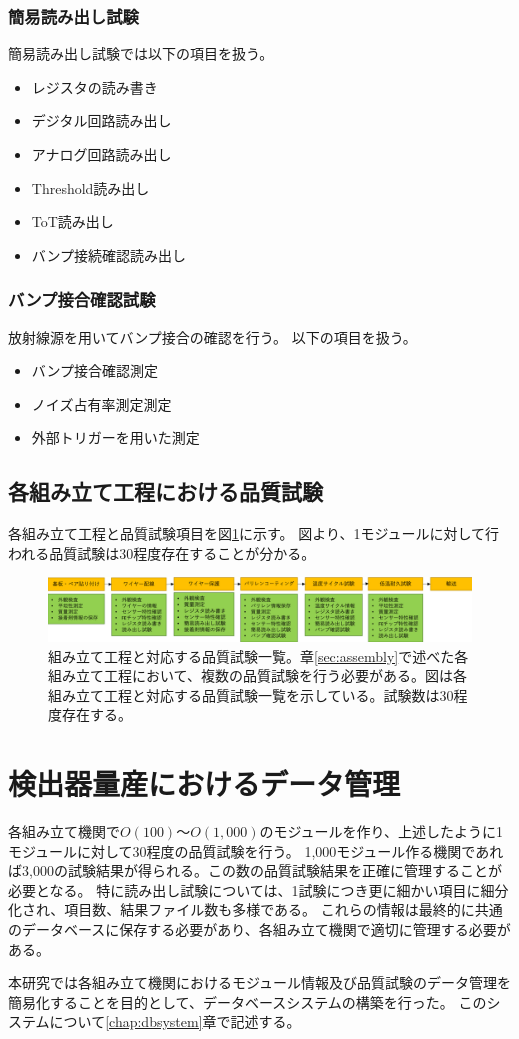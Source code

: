 \subsubsection{簡易読み出し試験}
簡易読み出し試験では以下の項目を扱う。
\begin{itemize}
  \item レジスタの読み書き
  \item デジタル回路読み出し
  \item アナログ回路読み出し
  \item Threshold読み出し
  \item ToT読み出し
  \item バンプ接続確認読み出し
\end{itemize}

\subsubsection{バンプ接合確認試験}
放射線源を用いてバンプ接合の確認を行う。
以下の項目を扱う。
\begin{itemize}
  \item バンプ接合確認測定
  \item ノイズ占有率測定測定
  \item 外部トリガーを用いた測定
\end{itemize}

\subsection{各組み立て工程における品質試験}

各組み立て工程と品質試験項目を図\ref{stage_test_flow}に示す。
図より、1モジュールに対して行われる品質試験は30程度存在することが分かる。

\begin{figure}[bpt]\centering
\includegraphics[width=15cm]{stage_test_flow}
\caption[組み立て工程と対応する品質試験一覧]{組み立て工程と対応する品質試験一覧。章\ref{sec:assembly}で述べた各組み立て工程において、複数の品質試験を行う必要がある。図は各組み立て工程と対応する品質試験一覧を示している。試験数は30程度存在する。}
\label{stage_test_flow}
\end{figure}

\section{検出器量産におけるデータ管理}
各組み立て機関で$O(100)〜O(1,000)$のモジュールを作り、上述したように1モジュールに対して30程度の品質試験を行う。
1,000モジュール作る機関であれば3,000の試験結果が得られる。この数の品質試験結果を正確に管理することが必要となる。
特に読み出し試験については、1試験につき更に細かい項目に細分化され、項目数、結果ファイル数も多様である。
これらの情報は最終的に共通のデータベースに保存する必要があり、各組み立て機関で適切に管理する必要がある。

本研究では各組み立て機関におけるモジュール情報及び品質試験のデータ管理を簡易化することを目的として、データベースシステムの構築を行った。
このシステムについて\ref{chap:dbsystem}章で記述する。

